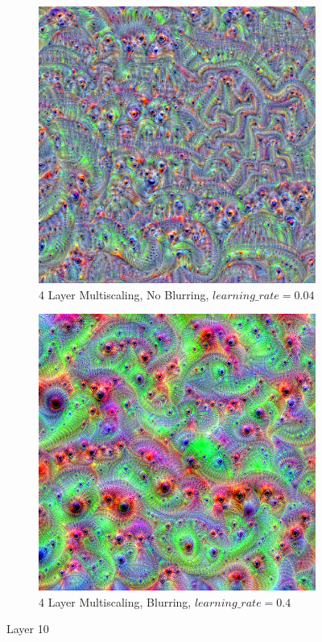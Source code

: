\begin{figure}
    \captionsetup{justification=centering}
    
    \begin{subfigure}[t]{0.42\textwidth}
        \captionsetup{justification=centering}
        \centering
        \includegraphics[width=.7\linewidth]{figuras/feat_vis/experiments/layers/final/l10/random_image_pl4_lr4e-2_layer21_no-blur.png}
        \caption{4 Layer Multiscaling, No Blurring, \(learning\_rate = 0.04\)}
    \end{subfigure}
    \hfill
    \begin{subfigure}[t]{0.42\textwidth}
        \captionsetup{justification=centering}
        \centering
        \includegraphics[width=.7\linewidth]{figuras/feat_vis/experiments/layers/final/l10/random_image_pl4_lr4e-1_layer21.png}
        \caption{4 Layer Multiscaling, Blurring, \(learning\_rate = 0.4\)}
    \end{subfigure}
    
    \caption{Layer 10}
    \label{fig:layer_10}
\end{figure}

